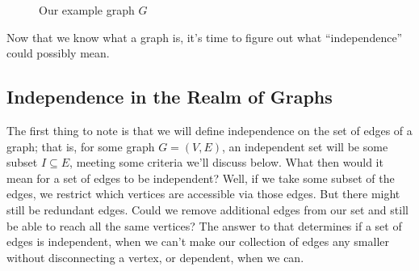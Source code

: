 \documentclass[12pt,oneside]{../../sfsuthesis}
\begin{document}
\begin{figure}[H]\label{fig:simpleGraph}
    \centering

    \caption{Our example graph \( G \)}

\end{figure}

Now that we know what a graph is, it's time to figure out what ``independence'' could possibly mean.



\subsection{Independence in the Realm of Graphs}

The first thing to note is that we will define independence on the set of edges of a graph;
that is, for some graph \( G = (V, E) \), an independent set will be some subset \( I \subseteq E \), meeting some criteria we'll discuss below.
What then would it mean for a set of edges to be independent?
Well, if we take some subset of the edges, we restrict which vertices are accessible via those edges.
But there might still be redundant edges.
Could we remove additional edges from our set and still be able to reach all the same vertices?
The answer to that determines if a set of edges is independent, when we can't make our collection of edges any smaller without disconnecting a vertex, or dependent, when we can.
\end{document}
